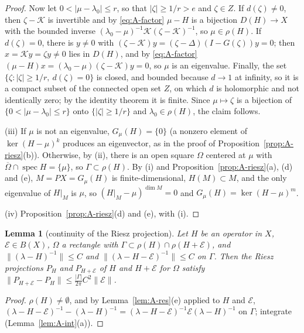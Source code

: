 \documentclass[11pt]{article}
\newtheorem{lemma}{Lemma}[section]
\theoremstyle{definition}
\newcommand{\spec}{\operatorname{spec}}
\begin{document}
\begin{proof}
Now let $0 < |\mu - \lambda_0| \le r$, so that $|\zeta| \ge 1/r > e$ and $\zeta \in Z$. If $d(\zeta) \ne 0$, then $\zeta - \mathcal K$ is invertible and by \eqref{eq:A-factor} $\mu - H$ is a bijection $D(H) \to X$ with the bounded inverse $(\lambda_0 - \mu)^{-1}\mathcal K(\zeta - \mathcal K)^{-1}$, so $\mu \in \rho(H)$. If $d(\zeta) = 0$, there is $y \ne 0$ with $(\zeta - \mathcal K)y = (\zeta - \Delta)(I - G(\zeta))y = 0$; then $x = \mathcal Ky = \zeta y \ne 0$ lies in $D(H)$, and by \eqref{eq:A-factor} $(\mu - H)x = (\lambda_0 - \mu)(\zeta - \mathcal K)y = 0$, so $\mu$ is an eigenvalue. Finally, the set $\{\zeta : |\zeta| \ge 1/r,\ d(\zeta) = 0\}$ is closed, and bounded because $d \to 1$ at infinity, so it is a compact subset of the connected open set $Z$, on which $d$ is holomorphic and not identically zero; by the identity theorem it is finite. Since $\mu \mapsto \zeta$ is a bijection of $\{0 < |\mu - \lambda_0| \le r\}$ onto $\{|\zeta| \ge 1/r\}$ and $\lambda_0 \in \rho(H)$, the claim follows.

(iii) If $\mu$ is not an eigenvalue, $G_\mu(H) = \{0\}$ (a nonzero element of $\ker(H - \mu)^k$ produces an eigenvector, as in the proof of Proposition~\ref{prop:A-riesz}(b)). Otherwise, by (ii), there is an open square $\Omega$ centered at $\mu$ with $\overline\Omega \cap \spec H = \{\mu\}$, so $\Gamma \subset \rho(H)$. By (i) and Proposition~\ref{prop:A-riesz}(a), (d) and (e), $M = PX = G_\mu(H)$ is finite-dimensional, $H(M) \subset M$, and the only eigenvalue of $H|_M$ is $\mu$, so $(H|_M - \mu)^{\dim M} = 0$ and $G_\mu(H) = \ker(H - \mu)^m$.

(iv) Proposition~\ref{prop:A-riesz}(d) and (e), with (i).
\end{proof}

\begin{lemma}[continuity of the Riesz projection]\label{lem:A-cont}
Let $H$ be an operator in $X$, $\mathcal E \in B(X)$, $\Omega$ a rectangle with $\Gamma \subset \rho(H) \cap \rho(H + \mathcal E)$, and $\|(\lambda - H)^{-1}\| \le C$ and $\|(\lambda - H - \mathcal E)^{-1}\| \le C$ on $\Gamma$. Then the Riesz projections $P_H$ and $P_{H+\mathcal E}$ of $H$ and $H + \mathcal E$ for $\Omega$ satisfy $\|P_{H+\mathcal E} - P_H\| \le \frac{|\Gamma|}{2\pi}C^2\|\mathcal E\|$.
\end{lemma}

\begin{proof}
$\rho(H) \ne \emptyset$, and by Lemma~\ref{lem:A-res}(e) applied to $H$ and $\mathcal E$, $(\lambda - H - \mathcal E)^{-1} - (\lambda - H)^{-1} = (\lambda - H - \mathcal E)^{-1}\mathcal E(\lambda - H)^{-1}$ on $\Gamma$; integrate (Lemma~\ref{lem:A-int}(a)).
\end{proof}
\end{document}
